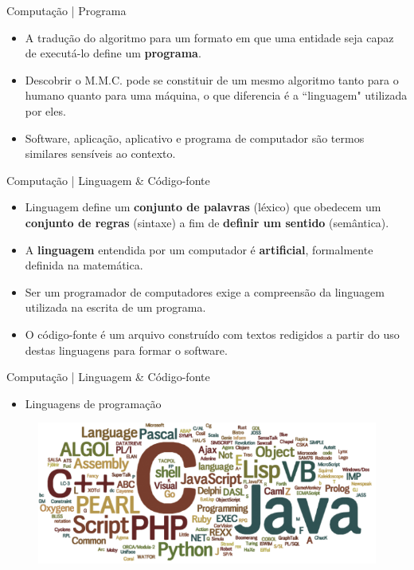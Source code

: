 \documentclass{beamer}
\begin{document}
\begin{frame}{Computação | Programa}
    \begin{itemize}
        \item A tradução do algoritmo para um formato em que uma entidade seja capaz de executá-lo define um \textbf{programa}.
        \item Descobrir o M.M.C. pode se constituir de um mesmo algoritmo tanto para o humano quanto para uma máquina, o que diferencia é a ``linguagem" utilizada por eles.
        \item Software, aplicação, aplicativo e programa de computador são termos similares sensíveis ao contexto.
    \end{itemize}
\end{frame}

\begin{frame}{Computação | Linguagem \& Código-fonte}
    \begin{itemize}
        \item Linguagem define um \textbf{conjunto de palavras} (léxico) que obedecem um \textbf{conjunto de regras} (sintaxe) a fim de \textbf{definir um sentido} (semântica).
        \item A \textbf{linguagem} entendida por um computador é \textbf{artificial}, formalmente definida na matemática.
        \item Ser um programador de computadores exige a compreensão da linguagem utilizada na escrita de um programa.
        \item O código-fonte é um arquivo construído com textos redigidos a partir do uso destas linguagens para formar o software.
    \end{itemize}
\end{frame}

\begin{frame}{Computação | Linguagem \& Código-fonte}
    \begin{itemize}
        \item Linguagens de programação
    \end{itemize}
    \begin{figure}
        \centering
        \includegraphics[width=0.8\linewidth]{img/prog-languages.png}
    \end{figure}
\end{frame}
\end{document}
